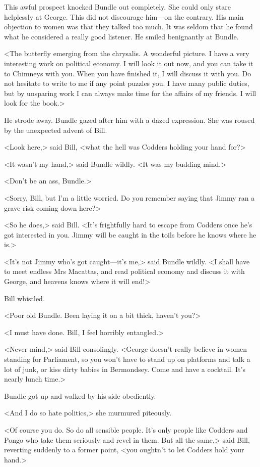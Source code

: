 This awful prospect knocked Bundle out completely. She could only stare helplessly at George. This did not discourage him—on the contrary. His main objection to women was that they talked too much. It was seldom that he found what he considered a really good listener. He smiled benignantly at Bundle.

<The butterfly emerging from the chrysalis. A wonderful picture. I have a very interesting work on political economy. I will look it out now, and you can take it to Chimneys with you. When you have finished it, I will discuss it with you. Do not hesitate to write to me if any point puzzles you. I have many public duties, but by unsparing work I can always make time for the affairs of my friends. I will look for the book.>

He strode away. Bundle gazed after him with a dazed expression. She was roused by the unexpected advent of Bill.

<Look here,> said Bill, <what the hell was Codders holding your hand for?>

<It wasn't my hand,> said Bundle wildly. <It was my budding mind.>

<Don't be an ass, Bundle.>

<Sorry, Bill, but I'm a little worried. Do you remember saying that Jimmy ran a grave risk coming down here?>

<So he does,> said Bill. <It's frightfully hard to escape from Codders once he's got interested in you. Jimmy will be caught in the toils before he knows where he is.>

<It's not Jimmy who's got caught—it's me,> said Bundle wildly. <I shall have to meet endless Mrs Macattas, and read political economy and discuss it with George, and heavens knows where it will end!>

Bill whistled.

<Poor old Bundle. Been laying it on a bit thick, haven't you?>

<I must have done. Bill, I feel horribly entangled.>

<Never mind,> said Bill consolingly. <George doesn't really believe in women standing for Parliament, so you won't have to stand up on platforms and talk a lot of junk, or kiss dirty babies in Bermondsey. Come and have a cocktail. It's nearly lunch time.>

Bundle got up and walked by his side obediently.

<And I do so hate politics,> she murmured piteously.

<Of course you do. So do all sensible people. It's only people like Codders and Pongo who take them seriously and revel in them. But all the same,> said Bill, reverting suddenly to a former point, <you oughtn't to let Codders hold your hand.>

